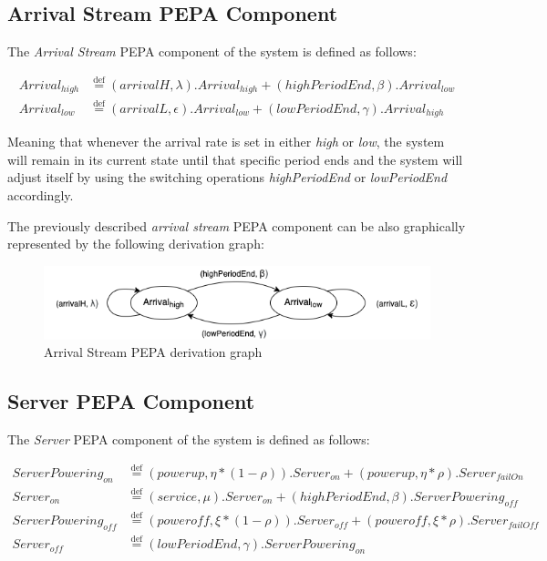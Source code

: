 \documentclass{article}
\newcommand*{\defeq}{\stackrel{\text{def}}{=}}
\begin{document}
\subsection{Arrival Stream PEPA Component}

The \textit{Arrival Stream} PEPA component of the system is defined as follows:

\begin{align*} 
    Arrival_{high} &\defeq (arrivalH, \lambda).Arrival_{high} + (highPeriodEnd, \beta). Arrival_{low} \\
    Arrival_{low} &\defeq (arrivalL, \epsilon).Arrival_{low} + (lowPeriodEnd, \gamma). Arrival_{high}
\end{align*} 

\noindent Meaning that whenever the arrival rate is set in either \textit{high} or \textit{low}, the system will remain in its current state until that specific period ends and the system will adjust itself by using the switching operations \textit{highPeriodEnd} or \textit{lowPeriodEnd} accordingly.\newline

\par\noindent The previously described \textit{arrival stream} PEPA component can be also  graphically represented by the following derivation graph:

\begin{figure}[H]
    \centering
    \includegraphics[width=1.0\textwidth]{arrival-stream-derivation-graph.png}
    \caption{Arrival Stream PEPA derivation graph}
    \label{fig:arrival-stream-derivation-graph}
\end{figure}

\subsection{Server PEPA Component}

The \textit{Server} PEPA component of the system is defined as follows:

\begin{align*} 
    ServerPowering_{on} &\defeq (powerup, \eta*(1 - \rho)).Server_{on} + (powerup, \eta * \rho).Server_{failOn} \\
    Server_{on} &\defeq (service, \mu).Server_{on} + (highPeriodEnd, \beta).ServerPowering_{off} \\
    ServerPowering_{off} &\defeq (poweroff, \xi*(1 - \rho)).Server_{off} + (poweroff, \xi * \rho).Server_{failOff} \\
    Server_{off} &\defeq (lowPeriodEnd, \gamma).ServerPowering_{on}
\end{align*}
\end{document}
